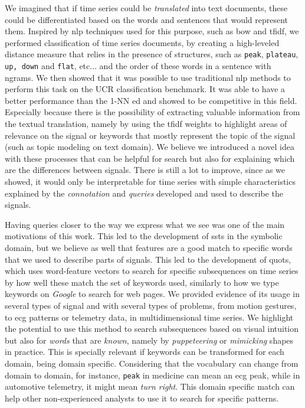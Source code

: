 We imagined that if time series could be \textit{translated} into text documents, these could be differentiated based on the words and sentences that would represent them. Inspired by \gls{nlp} techniques used for this purpose, such as \gls{bow} and \gls{tfidf}, we performed classification of time series documents, by creating a high-leveled distance measure that relies in the presence of structures, such as \texttt{peak}, \texttt{plateau}, \texttt{up, down} and \texttt{flat}, etc... and the order of these words in a sentence with ngrams. We then showed that it was possible to use traditional \gls{nlp} methods to perform this task on the UCR classification benchmark. It was able to have a better performance than the 1-NN \gls{ed} and showed to be competitive in this field. Especially because there is the possibility of extracting valuable information from the textual translation, namely by using the \gls{tfidf} weights to highlight areas of relevance on the signal or keywords that mostly represent the topic of the signal (such as topic modeling on text domain). We believe we introduced a novel idea with these processes that can be helpful for search but also for explaining which are the differences between signals. There is still a lot to improve, since as we showed, it would only be interpretable for time series with simple characteristics explained by the \textit{connotation} and \textit{queries} developed and used to describe the signals.
\par
Having queries closer to the way we express what we see was one of the main motivations of this work. This led to the development of \gls{ssts} in the symbolic domain, but we believe as well that features are a good match to specific words that we used to describe parts of signals. This led to the development of \gls{quots}, which uses word-feature vectors to search for specific subsequences on time series by how well these match the set of keywords used, similarly to how we type keywords on \textit{Google} to search for web pages. We provided evidence of its usage in several types of signal and with several types of problems, from motion gestures, to \gls{ecg} patterns or telemetry data, in multidimensional time series. We highlight the potential to use this method to search subsequences based on visual intuition but also for \textit{words} that are \textit{known}, namely by \textit{puppeteering} or \textit{mimicking} shapes in practice. This is specially relevant if keywords can be transformed for each domain, being domain specific. Considering that the vocabulary can change from domain to domain, for instance, \texttt{peak} in medicine can mean an \gls{ecg} peak, while in automotive telemetry, it might mean \textit{turn right}. This domain specific match can help other non-experienced analysts to use it to search for specific patterns.

